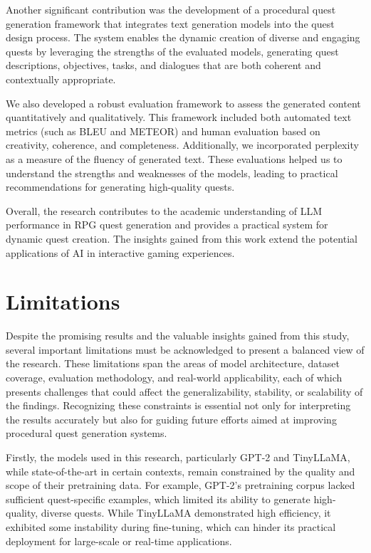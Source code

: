 Another significant contribution was the development of a procedural quest generation
framework that integrates text generation models into the quest design process. The
system enables the dynamic creation of diverse and engaging quests by leveraging the
strengths of the evaluated models, generating quest descriptions, objectives, tasks, and
dialogues that are both coherent and contextually appropriate.

We also developed a robust evaluation framework to assess the generated content
quantitatively and qualitatively. This framework included both automated text metrics
(such as BLEU and METEOR) and human evaluation based on creativity, coherence, and
completeness. Additionally, we incorporated perplexity as a measure of the fluency of
generated text. These evaluations helped us to understand the strengths and weaknesses
of the models, leading to practical recommendations for generating high-quality quests.

Overall, the research contributes to the academic understanding of LLM performance
in RPG quest generation and provides a practical system for dynamic quest creation.
The insights gained from this work extend the potential applications of AI in interactive
gaming experiences.

\section{Limitations}

Despite the promising results and the valuable insights gained from this study, several
important limitations must be acknowledged to present a balanced view of the research.
These limitations span the areas of model architecture, dataset coverage, evaluation
methodology, and real-world applicability, each of which presents challenges that could
affect the generalizability, stability, or scalability of the findings. Recognizing these constraints
is essential not only for interpreting the results accurately but also for guiding
future efforts aimed at improving procedural quest generation systems.

Firstly, the models used in this research, particularly GPT-2 and TinyLLaMA, while
state-of-the-art in certain contexts, remain constrained by the quality and scope of their
pretraining data. For example, GPT-2's pretraining corpus lacked sufficient quest-specific
examples, which limited its ability to generate high-quality, diverse quests. While TinyLLaMA
demonstrated high efficiency, it exhibited some instability during fine-tuning, which can hinder its practical deployment for large-scale or real-time applications.

